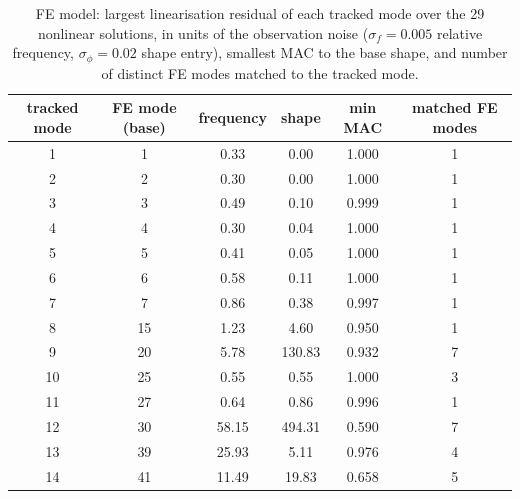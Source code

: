 \begin{table}[h]\centering\footnotesize
\caption{FE model: largest linearisation residual of each tracked mode over the 29 nonlinear solutions, in units of the observation noise ($\sigma_f=0.005$ relative frequency, $\sigma_\phi=0.02$ shape entry), smallest MAC to the base shape, and number of distinct FE modes matched to the tracked mode.}\label{tab:s8}
\begin{tabular}{cccccc}\toprule tracked mode & FE mode (base) & frequency & shape & min MAC & matched FE modes\\ \midrule
1 & 1 & 0.33 & 0.00 & 1.000 & 1 \\
2 & 2 & 0.30 & 0.00 & 1.000 & 1 \\
3 & 3 & 0.49 & 0.10 & 0.999 & 1 \\
4 & 4 & 0.30 & 0.04 & 1.000 & 1 \\
5 & 5 & 0.41 & 0.05 & 1.000 & 1 \\
6 & 6 & 0.58 & 0.11 & 1.000 & 1 \\
7 & 7 & 0.86 & 0.38 & 0.997 & 1 \\
8 & 15 & 1.23 & 4.60 & 0.950 & 1 \\
9 & 20 & 5.78 & 130.83 & 0.932 & 7 \\
10 & 25 & 0.55 & 0.55 & 1.000 & 3 \\
11 & 27 & 0.64 & 0.86 & 0.996 & 1 \\
12 & 30 & 58.15 & 494.31 & 0.590 & 7 \\
13 & 39 & 25.93 & 5.11 & 0.976 & 4 \\
14 & 41 & 11.49 & 19.83 & 0.658 & 5 \\
\bottomrule\end{tabular}\end{table}